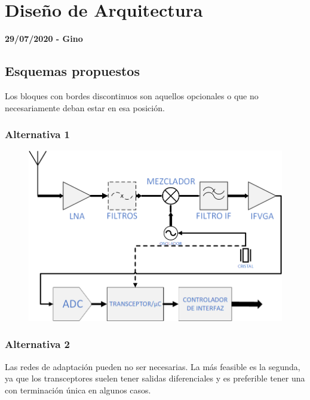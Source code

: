 \documentclass[a4paper,12pt]{report} %
\begin{document}
\chapter{Diseño de Arquitectura}

\textbf{29/07/2020 - Gino}

\section{Esquemas propuestos}

Los bloques con bordes discontinuos son aquellos opcionales o que no necesariamente deban estar en esa posición.

\subsection{Alternativa 1}

\begin{figure}[H]
	\centering
	\includegraphics[scale=0.6]{Imagenes/Arquitectura/diagrama1}
\end{figure}

\subsection{Alternativa 2}

Las redes de adaptación pueden no ser necesarias. La más feasible es la segunda, ya que los transceptores suelen tener salidas diferenciales y es preferible tener una con terminación única en algunos casos.
\end{document}
